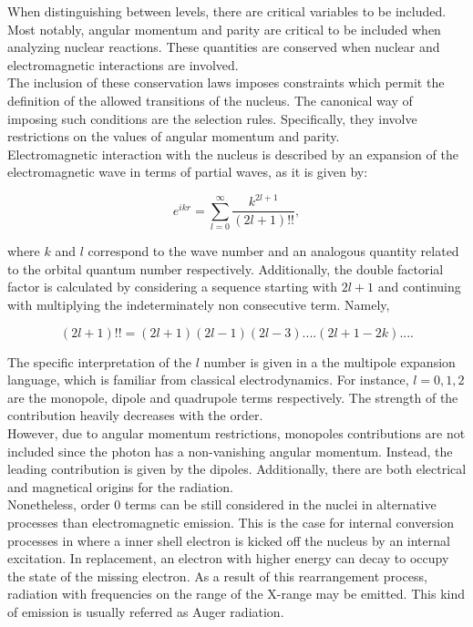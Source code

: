 \documentclass[openany]{book}
\begin{document}
When distinguishing between levels, there are critical variables to be included. Most notably, angular momentum and parity are critical to be included when analyzing nuclear reactions. These quantities are conserved when nuclear and electromagnetic interactions are involved.  \\

The inclusion of these conservation laws imposes constraints which permit the definition of the allowed transitions of the nucleus. The canonical way of imposing such conditions are the selection rules. Specifically, they involve restrictions on the values of angular momentum and parity.  \\

Electromagnetic interaction with the nucleus is described by an expansion of the electromagnetic wave in terms of partial waves, as it is given by: 

\begin{equation}\label{eq:nuclearTransitions_waveExpansion}
	e^{ikr} = \sum_{l = 0}^{\infty} {\frac{k^{2l + 1}}{(2l +1)!!}}, 
\end{equation}

where $k$ and $l$ correspond to the wave number and an analogous quantity related to the orbital quantum number respectively. Additionally, the double factorial factor is calculated by considering a sequence starting with $2l +1$ and continuing with multiplying the indeterminately non consecutive term. Namely, 

\begin{equation}\label{eq:nuclearTransitions_doubleFactorial}
	(2l + 1)!! = (2l +1)(2l-1)(2l -3 ) .... (2l + 1 - 2k) ....
\end{equation}

The specific interpretation of the $l$ number is given in a the multipole expansion language, which is familiar from classical electrodynamics.  For instance, $l = 0, 1, 2$ are the monopole, dipole and quadrupole terms respectively. The strength of the contribution heavily decreases with the order.  \\

However, due to angular momentum restrictions, monopoles contributions are not included since the photon has a non-vanishing angular momentum. Instead, the leading contribution is given by the dipoles. Additionally, there are both electrical and magnetical origins for the radiation.  \\

Nonetheless, order 0 terms can be still considered in the nuclei in alternative processes than electromagnetic emission. This is the case for internal conversion processes in where a inner shell electron is kicked off the nucleus by an internal excitation. In replacement, an electron with higher energy can decay to occupy the state of the missing electron. As a result of this rearrangement process, radiation with frequencies on the range of the X-range may be emitted. This kind of emission is usually referred as Auger radiation. \\
\end{document}
